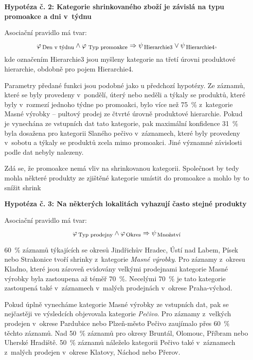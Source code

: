 \vspace*{1em}

\textbf{Hypotéza č. 2: Kategorie shrinkovaného zboží je závislá na typu promoakce a dni v~týdnu}

Asociační pravidlo má tvar:
\begin{equation}
    \varphi_{\mbox{\,\footnotesize Den v~týdnu}} \land \varphi_{\,\mbox{\,\footnotesize Typ promoakce}} \Rightarrow \psi_{\mbox{\,\footnotesize Hierarchie3}} \lor \psi_{\mbox{\,\footnotesize Hierarchie4}},
\end{equation}
kde označením Hierarchie3 jsou myšleny kategorie na třetí úrovni produktové hierarchie, obdobně pro pojem Hierarchie4.

Parametry předané funkci jsou podobné jako u předchozí hypotézy. Ze záznamů, které se byly provedeny v~pondělí, úterý nebo neděli a týkaly se produktů, které byly v~rozmezí  jednoho týdne po promoakci, bylo více než 75~\% z~kategorie Masné výrobky -- pultový prodej ze čtvrté úrovně produktové hierarchie. Pokud je vynechána ze vstupních dat tato kategorie, pak maximální konfidence 31~\% byla dosažena pro kategorii Slaného pečivo v~záznamech, které byly provedeny v~sobotu a týkaly se produktů zcela mimo promoakci. Jiné významné závislosti podle dat nebyly nalezeny.

Zdá se, že promoakce nemá vliv na shrinkovanou kategorii. Společnost by tedy mohla některé produkty ze zjištěné kategorie umístit do promoakce a mohlo by to snížit shrink

\vspace*{1em}

\textbf{Hypotéza č. 3: Na některých lokalitách vyhazují často stejné produkty}

Asociační pravidlo má tvar:
\begin{equation}
    \varphi_{\mbox{\,\footnotesize Typ prodejny}} \land \varphi_{\,\mbox{\footnotesize Okres}} \Rightarrow \psi_{\mbox{\,\footnotesize Množství}}
\end{equation}

60~\% záznamů týkajících se okresů Jindřichův Hradec, Ústí nad Labem, Písek nebo Strakonice tvoří shrinky z~kategorie \emph{Masné výrobky}. Pro záznamy z~okresu Kladno, které jsou zároveň evidovány velkými prodejnami kategorie Masné výrobky byla zastoupena až téměř 70~\%. Necelými 70~\% je tato kategorie zastoupená také v~záznamech v~malých prodejnách v~okrese Praha-východ.

Pokud úplně vynecháme kategorie Masné výrobky ze vstupních dat, pak se nejčastěji ve výsledcích objevovala kategorie \emph{Pečivo}. Pro záznamy z~velkých prodejen v~okrese Pardubice nebo Plzeň-město Pečivo zaujímalo přes 60~\% těchto záznamů. Nad 50~\% záznamů pro okresy Bruntál, Olomouc, Příbram nebo Uherské Hradiště. 50~\% záznamů náleželo kategorii Pečivo také v~záznamech z~malých prodejen v~okrese Klatovy, Náchod nebo Přerov.

